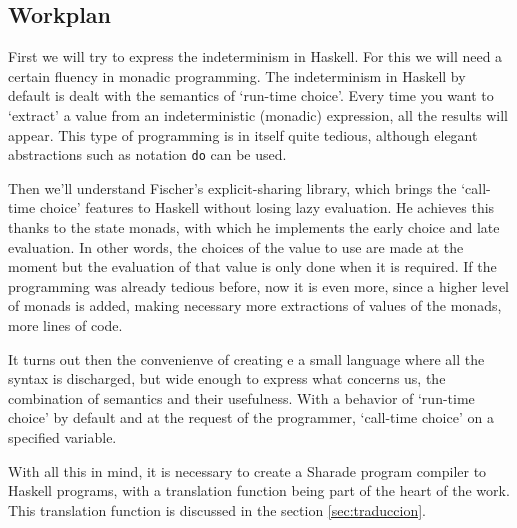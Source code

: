 \documentclass[class=article, crop=false]{standalone}
\begin{document}
\subsection{Workplan}
First we will try to express the indeterminism in Haskell. For this we will need a certain
fluency in monadic programming.  The indeterminism in Haskell by default is dealt with the
semantics of `run-time choice'. Every time you want to `extract' a value from an
indeterministic (monadic) expression, all the results will appear. This type of programming
is in itself quite tedious, although elegant abstractions such as notation \verb`do` can be
used.

Then we'll understand Fischer's explicit-sharing library, which brings the `call-time choice'
features to Haskell without losing lazy evaluation. He achieves this thanks to the state
monads, with which he implements the early choice and late evaluation. In other words, the
choices of the value to use are made at the moment but the evaluation of that value is only
done when it is required. If the programming was already tedious before, now it is even more,
since a higher level of monads is added, making necessary more extractions of values of the
monads, more lines of code.

It turns out then the convenienve of creating e a small language where all the syntax is
discharged, but wide enough to express what concerns us, the combination of semantics and
their usefulness. With a behavior of `run-time choice' by default and at the request of the
programmer, `call-time choice' on a specified variable.

With all this in mind, it is necessary to create a Sharade program compiler to Haskell
programs, with a translation function being part of the heart of the work. This translation
function is discussed in the section \ref{sec:traduccion}.
\end{document}
